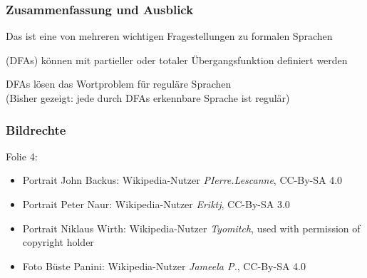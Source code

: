 \documentclass[aspectratio=1610,onlymath]{beamer}
\begin{document}
\begin{frame}\frametitle{Zusammenfassung und Ausblick}

Das  ist eine von mehreren wichtigen Fragestellungen zu formalen Sprachen
\bigskip

 (DFAs) können mit partieller oder totaler Übergangsfunktion definiert werden\bigskip

DFAs lösen das Wortproblem für reguläre Sprachen\\
\textcolor{devilscss}{(Bisher gezeigt: jede durch DFAs erkennbare Sprache ist regulär)}
\bigskip



\end{frame}



\begin{frame}\frametitle{Bildrechte}

Folie 4:\\
\begin{itemize}
\item Portrait John Backus: Wikipedia-Nutzer \emph{PIerre.Lescanne}, CC-By-SA 4.0
\item Portrait Peter Naur: Wikipedia-Nutzer \emph{Eriktj}, CC-By-SA 3.0
\item Portrait Niklaus Wirth: Wikipedia-Nutzer  \emph{Tyomitch}, used with permission of copyright holder
\item Foto Büste Panini: Wikipedia-Nutzer \emph{Jameela P.}, CC-By-SA 4.0
\end{itemize}

\end{frame}%
\end{document}
